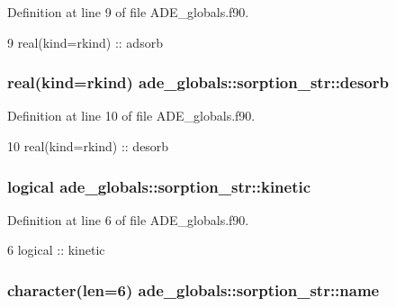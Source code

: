 Definition at line 9 of file A\+D\+E\+\_\+globals.\+f90.


\begin{DoxyCode}
9     \textcolor{keywordtype}{real(kind=rkind)} :: adsorb
\end{DoxyCode}
\subsubsection[{desorb}]{\setlength{\rightskip}{0pt plus 5cm}real(kind=rkind) ade\+\_\+globals\+::sorption\+\_\+str\+::desorb}\label{structade__globals_1_1sorption__str_a63761cfcb60d85e49e168f87ce9181eb}


Definition at line 10 of file A\+D\+E\+\_\+globals.\+f90.


\begin{DoxyCode}
10     \textcolor{keywordtype}{real(kind=rkind)} :: desorb
\end{DoxyCode}
\subsubsection[{kinetic}]{\setlength{\rightskip}{0pt plus 5cm}logical ade\+\_\+globals\+::sorption\+\_\+str\+::kinetic}\label{structade__globals_1_1sorption__str_aa4d64b2763e9d72d00eab863d95e8b0a}


Definition at line 6 of file A\+D\+E\+\_\+globals.\+f90.


\begin{DoxyCode}
6     \textcolor{keywordtype}{logical} :: kinetic
\end{DoxyCode}
\subsubsection[{name}]{\setlength{\rightskip}{0pt plus 5cm}character(len=6) ade\+\_\+globals\+::sorption\+\_\+str\+::name}\label{structade__globals_1_1sorption__str_a22ae684faa5dd40d1d4c1406d1e422ed}


